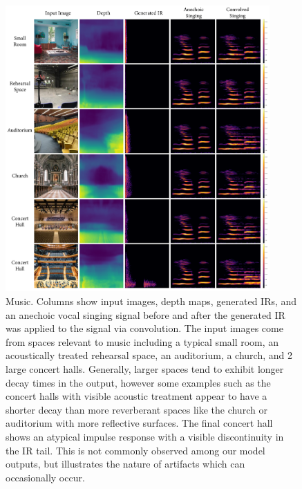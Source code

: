 \begin{figure}
    \centering
    \includegraphics[width=0.9\textwidth]{p_music.png}
    \caption{Music. Columns show input images, depth maps, generated IRs, and an anechoic vocal singing signal before and after the generated IR was applied to the signal via convolution. The input images come from spaces relevant to music including a typical small room, an acoustically treated rehearsal space, an auditorium, a church, and 2 large concert halls. Generally, larger spaces tend to exhibit longer decay times in the output, however some examples such as the concert halls with visible acoustic treatment appear to have a shorter decay than more reverberant spaces like the church or auditorium with more reflective surfaces. The final concert hall shows an atypical impulse response with a visible discontinuity in the IR tail. This is not commonly observed among our model outputs, but illustrates the nature of artifacts which can occasionally occur.}
    \label{fig:p_music}
\end{figure}

